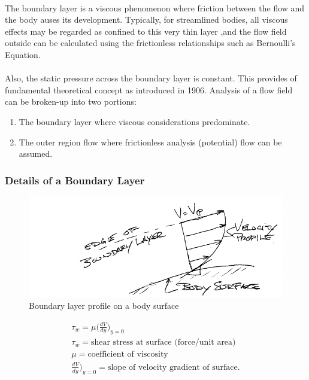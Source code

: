 \documentclass[draft=false, titlepage]{article}
\begin{document}
\paragraph*{} The boundary layer is a viscous phenomenon where friction between the flow and the body auses its development. Typically, for streamlined bodies, all viscous effects may be regarded as confined to this very thin layer ,and the flow field outside can be calculated using the frictionless relationships such as Bernoulli's Equation.
\paragraph*{} Also, the static pressure across the boundary layer is constant. This provides of fundamental theoretical concept as introduced in 1906. Analysis of a flow field can be broken-up into two portions: %
\begin{enumerate}
	\item The boundary layer where viscous considerations predominate.
	\item The outer region flow where frictionless analysis (potential) flow can be assumed.
\end{enumerate}

\subsubsection{Details of a Boundary Layer}
\begin{figure}[ht]
	\centering
	\includegraphics[width=0.6\linewidth]{Figures/p17_velocityProfile1.PNG}
	\caption{Boundary layer profile on a body surface}
	\label{fig:p17_boundaryLayer1}
\end{figure}
\begin{gather*}
\tau_w = \mu \big( \frac{dV}{dy} \big)_{y=0}\\
\tau_w = \text{shear stress at surface (force/unit area)}\\
\mu = \text{coefficient of viscosity}\\
\frac{dV}{dy}\big)_{y=0} = \text{slope of velocity gradient of surface.}
\end{gather*}
\end{document}
